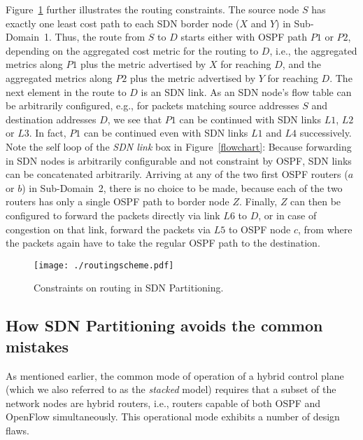 \documentclass[journal]{IEEEtran}
\begin{document}
\par Figure~\ref{routing_scheme} further illustrates the routing constraints. The source node $S$ has exactly one least cost path to each SDN border node ($X$ and $Y$) in Sub-Domain~1. Thus, the route from $S$ to $D$ starts either with OSPF path $P1$ or $P2$, depending on the aggregated cost metric for the routing to $D$, i.e., the aggregated metrics along $P1$ plus the metric advertised by $X$ for reaching $D$, and the aggregated metrics along $P2$ plus the metric advertised by $Y$ for reaching $D$. The next element in the route to $D$ is an SDN link. As an SDN node's flow table can be arbitrarily configured, e.g., for packets matching source addresses $S$ and destination addresses $D$, we see that $P1$ can be continued with SDN links $L1$, $L2$ or $L3$. In fact, $P1$ can be continued even with SDN links $L1$ and $L4$ successively. Note the self loop of the \emph{SDN link} box in Figure~\ref{flowchart}: Because forwarding in SDN nodes is arbitrarily configurable and not constraint by OSPF, SDN links can be concatenated arbitrarily. Arriving at any of the two first OSPF routers ($a$ or $b$) in Sub-Domain~2, there is no choice to be made, because each of the two routers has only a single OSPF path to border node $Z$. Finally, $Z$ can then be configured to forward the packets directly via link $L6$ to $D$, or in case of congestion on that link, forward the packets via $L5$ to OSPF node $c$, from where the packets again have to take the regular OSPF path to the destination.

\begin{figure}[h] \center
\texttt{[image: ./routingscheme.pdf]}
\caption{Constraints on routing in SDN Partitioning.}
\label{routing_scheme} \end{figure}

\subsection{How SDN Partitioning avoids the common mistakes}\label{how_we_avoid_flaws_of_stacked_model}
\par As mentioned earlier, the common mode of operation of a hybrid control plane (which we also referred to as the \emph{stacked} model) requires that a subset of the network nodes are hybrid routers, i.e., routers capable of both OSPF and OpenFlow simultaneously. This operational mode exhibits a number of design flaws. 
\end{document}
